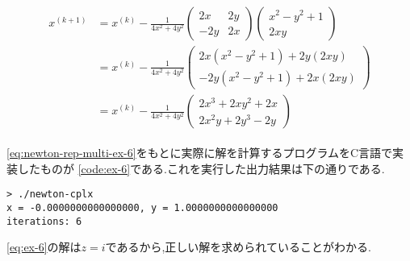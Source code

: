 \documentclass[autodetect-engine, dvi=dvipdfmx, 10pt, a4paper, ja=standard]{bxjsarticle}
\begin{document}
\begin{align}
	\begin{split}
		\label{eq:newton-rep-multi-ex-6}
		x^{(k+1)} & = x^{(k)} - \frac{1}{4x^2 + 4y^2} \begin{pmatrix}
			                                              2x  & 2y \\
			                                              -2y & 2x
		                                              \end{pmatrix}
		\begin{pmatrix}
			x^2 - y^2 + 1 \\
			2xy
		\end{pmatrix}
		\\
		          & = x^{(k)} - \frac{1}{4x^2 + 4y^2} \begin{pmatrix}
			                                              2x(x^2 - y^2 + 1) + 2y(2xy) \\
			                                              -2y(x^2 - y^2 + 1) + 2x(2xy)
		                                              \end{pmatrix}
		\\
		          & = x^{(k)} - \frac{1}{4x^2 + 4y^2} \begin{pmatrix}
			                                              2x^3 + 2xy^2 + 2x \\
			                                              2x^{2}y + 2y^3 - 2y
		                                              \end{pmatrix}
	\end{split}
\end{align}

\ref{eq:newton-rep-multi-ex-6}をもとに実際に解を計算するプログラムをC言語で実装したものが
\ref{code:ex-6}である.これを実行した出力結果は下の通りである.

\begin{verbatim}
> ./newton-cplx
x = -0.0000000000000000, y = 1.0000000000000000
iterations: 6
\end{verbatim}

\ref{eq:ex-6}の解は$z = i$であるから,正しい解を求められていることがわかる.
\end{document}
